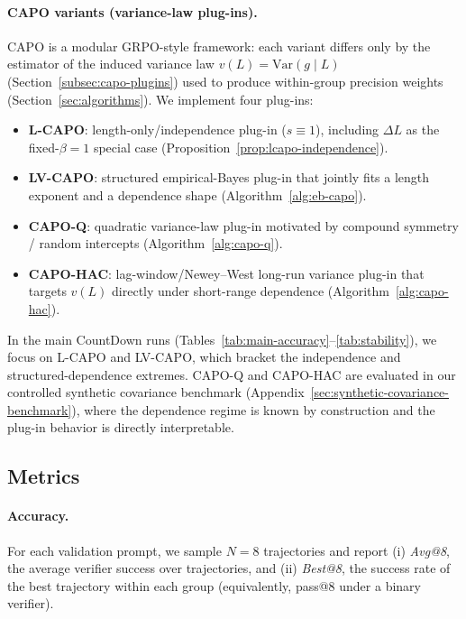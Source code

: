 \paragraph{CAPO variants (variance-law plug-ins).}
CAPO is a modular GRPO-style framework: each variant differs only by the estimator of the induced variance law $v(L)=\mathrm{Var}(g\mid L)$ (Section~\ref{subsec:capo-plugins}) used to produce within-group precision weights (Section~\ref{sec:algorithms}). We implement four plug-ins:
\begin{itemize}
  \item \textbf{L-CAPO}: length-only/independence plug-in ($s\equiv 1$), including $\Delta L$ as the fixed-$\beta{=}1$ special case (Proposition~\ref{prop:lcapo-independence}).
  \item \textbf{LV-CAPO}: structured empirical-Bayes plug-in that jointly fits a length exponent and a dependence shape (Algorithm~\ref{alg:eb-capo}).
  \item \textbf{CAPO-Q}: quadratic variance-law plug-in motivated by compound symmetry / random intercepts (Algorithm~\ref{alg:capo-q}).
  \item \textbf{CAPO-HAC}: lag-window/Newey--West long-run variance plug-in that targets $v(L)$ directly under short-range dependence (Algorithm~\ref{alg:capo-hac}).
\end{itemize}
In the main CountDown runs (Tables~\ref{tab:main-accuracy}--\ref{tab:stability}), we focus on L-CAPO and LV-CAPO, which bracket the independence and structured-dependence extremes. CAPO-Q and CAPO-HAC are evaluated in our controlled synthetic covariance benchmark (Appendix~\ref{sec:synthetic-covariance-benchmark}), where the dependence regime is known by construction and the plug-in behavior is directly interpretable.

\subsection{Metrics}
\paragraph{Accuracy.} For each validation prompt, we sample $N=8$ trajectories
and report (i) \emph{Avg@8}, the average verifier success over trajectories, and
(ii) \emph{Best@8}, the success rate of the best trajectory within each group
(equivalently, pass@8 under a binary verifier).

